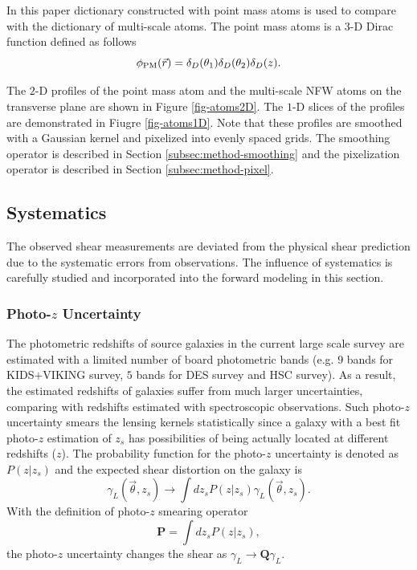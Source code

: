 \documentclass[twocolumn]{aastex62}
\begin{document}
In this paper dictionary constructed with point mass atoms is used to compare with the dictionary of multi-scale atoms.
The point mass atoms is a $3$-D Dirac function defined as follows
\begin{equation}
\phi_{\rm{PM}}(\vec{r})= \delta_D(\theta_1) \delta_D(\theta_2) \delta_D(z).
\end{equation}

The $2$-D profiles of the point mass atom and the multi-scale NFW atoms on the transverse plane are shown in Figure 
\ref{fig-atoms2D}. The $1$-D slices of the profiles are demonstrated in Fiugre \ref{fig-atoms1D}. Note that these profiles 
are smoothed with a Gaussian kernel and pixelized into evenly spaced grids. The smoothing operator is described in 
Section \ref{subsec:method-smoothing} and the pixelization operator is described in Section \ref{subsec:method-pixel}.

\subsection{Systematics}
\label{subsec:method-Systematics}

The observed shear measurements are deviated from the physical shear prediction due to the systematic 
errors from observations. The influence of systematics is carefully studied and incorporated into the forward 
modeling in this section.

\subsubsection{Photo-$z$ Uncertainty}
\label{subsec:method-photoz}

The photometric redshifts of source galaxies in the current large scale survey are estimated with a limited number of 
board photometric bands (e.g. $9$ bands for KIDS$+$VIKING survey, $5$ bands for DES survey and HSC survey). As a result, 
the estimated redshifts of galaxies suffer from much larger uncertainties, comparing with redshifts estimated with 
spectroscopic observations. Such photo-$z$ uncertainty smears the lensing kernels statistically since a galaxy with a 
best fit photo-$z$ estimation of $z_s$ has possibilities of being actually located at different redshifts ($z$).
The probability function for the photo-$z$ uncertainty is denoted as $P(z|z_s)$ and the expected shear distortion on 
the galaxy is
\begin{equation}\label{eq-delta2gamma-poz}
\gamma_L(\vec{\theta},z_s) \rightarrow \int dz_s P(z|z_s) \gamma_L(\vec{\theta},z_s).
\end{equation}
With the definition of photo-$z$ smearing operator
\begin{equation}
\mathbf{P} = \int dz_s P(z|z_s),
\end{equation}
the photo-$z$ uncertainty changes the shear as $\gamma_L \rightarrow \mathbf{Q} \gamma_L$.
\end{document}
